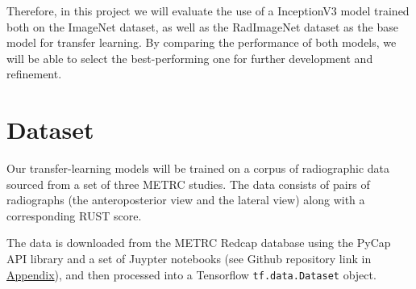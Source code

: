 Therefore, in this project we will evaluate the use of a InceptionV3 model trained both on the ImageNet dataset, as well as the RadImageNet dataset as the base model for transfer learning. By comparing the performance of both models, we will be able to select the best-performing one for further development and refinement. 


\section{Dataset}\label{sec:dataset}

Our transfer-learning models will be trained on a corpus of radiographic data sourced from a set of three METRC studies. \autocites{RetroDEFECT2022}{PAIN2017}{PACS2022} The data consists of pairs of radiographs (the anteroposterior view and the lateral view) along with a corresponding RUST score. 




\noindent
The data is downloaded from the METRC Redcap database using the PyCap API library \autocite{pycap} and a set of Juypter notebooks (see Github repository link in \hyperref[sec:appendix-repo]{Appendix}), and then processed into a Tensorflow \texttt{tf.data.Dataset} object.

